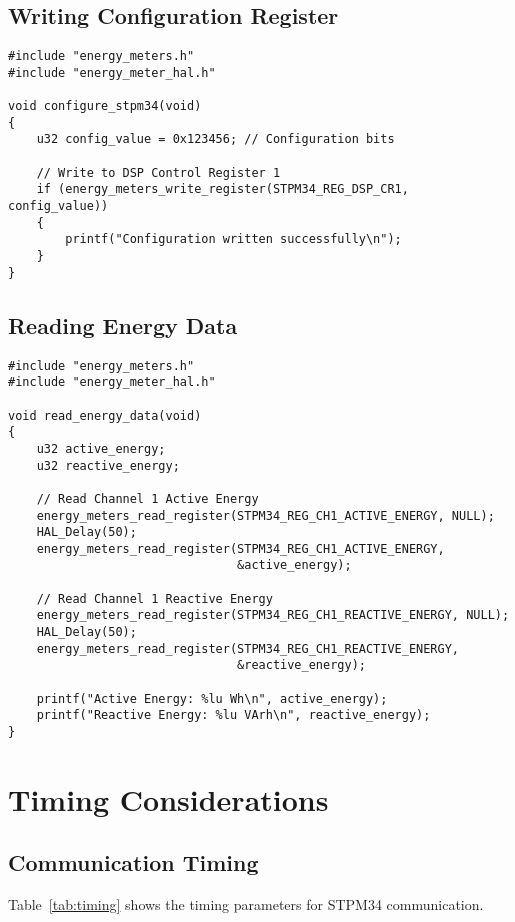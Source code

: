 \documentclass[11pt,a4paper]{article}
\begin{document}
\subsection{Writing Configuration Register}

\begin{lstlisting}
#include "energy_meters.h"
#include "energy_meter_hal.h"

void configure_stpm34(void)
{
    u32 config_value = 0x123456; // Configuration bits

    // Write to DSP Control Register 1
    if (energy_meters_write_register(STPM34_REG_DSP_CR1, config_value))
    {
        printf("Configuration written successfully\n");
    }
}
\end{lstlisting}

\subsection{Reading Energy Data}

\begin{lstlisting}
#include "energy_meters.h"
#include "energy_meter_hal.h"

void read_energy_data(void)
{
    u32 active_energy;
    u32 reactive_energy;

    // Read Channel 1 Active Energy
    energy_meters_read_register(STPM34_REG_CH1_ACTIVE_ENERGY, NULL);
    HAL_Delay(50);
    energy_meters_read_register(STPM34_REG_CH1_ACTIVE_ENERGY,
                                &active_energy);

    // Read Channel 1 Reactive Energy
    energy_meters_read_register(STPM34_REG_CH1_REACTIVE_ENERGY, NULL);
    HAL_Delay(50);
    energy_meters_read_register(STPM34_REG_CH1_REACTIVE_ENERGY,
                                &reactive_energy);

    printf("Active Energy: %lu Wh\n", active_energy);
    printf("Reactive Energy: %lu VArh\n", reactive_energy);
}
\end{lstlisting}

\section{Timing Considerations}

\subsection{Communication Timing}

Table~\ref{tab:timing} shows the timing parameters for STPM34 communication.
\end{document}
